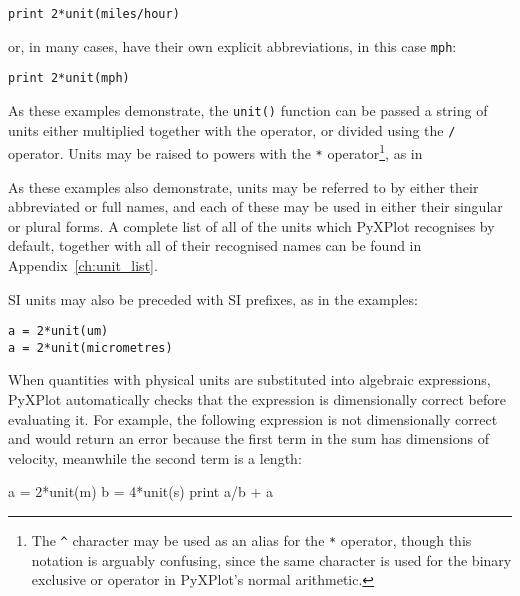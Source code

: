 \begin{verbatim}
print 2*unit(miles/hour)
\end{verbatim}

\noindent or, in many cases, have their own explicit abbreviations, in this
case {\tt mph}:

\begin{verbatim}
print 2*unit(mph)
\end{verbatim}

\noindent As these examples demonstrate, the {\tt unit()} function can be
passed a string of units either multiplied together with the {\tt *} operator,
or divided using the {\tt /} operator. Units may be raised to powers with the
{\tt **} operator\footnote{The {\tt \^{}} character may be used as an alias for
the {\tt **} operator, though this notation is arguably confusing, since the
same character is used for the binary exclusive or operator in PyXPlot's normal
arithmetic.}, as in

\vspace{3mm}
\newline
{}\newline
{}
\vspace{3mm}

\noindent As these examples also demonstrate, units may be referred to by either
their abbreviated or full names, and each of these may be used in either their
singular or plural forms.  A complete list of all of the units which PyXPlot
recognises by default, together with all of their recognised names can be found
in Appendix~\ref{ch:unit_list}.

SI units may also be preceded with SI prefixes, as in
the examples:

\begin{verbatim}
a = 2*unit(um)
a = 2*unit(micrometres)
\end{verbatim}

When quantities with physical units are substituted into algebraic expressions,
PyXPlot automatically checks that the expression is dimensionally correct
before evaluating it. For example, the following expression is not
dimensionally correct and would return an error because the first term in the
sum has dimensions of velocity, meanwhile the second term is a length:

\begin{dontdo}
a = 2*unit(m)\newline
b = 4*unit(s)\newline
print a/b + a
\end{dontdo}

